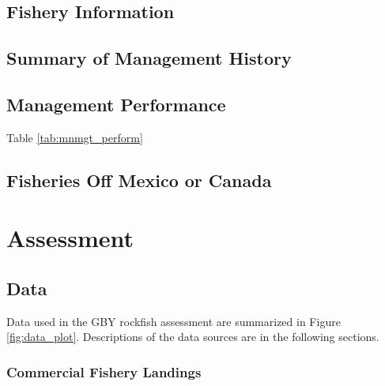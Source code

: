 \documentclass[12pt,]{article}
\begin{document}
\subsection{Fishery Information}\label{fishery-information}

\subsection{Summary of Management
History}\label{summary-of-management-history}

\subsection{Management Performance}\label{management-performance-1}

Table \ref{tab:mnmgt_perform}

\subsection{Fisheries Off Mexico or
Canada}\label{fisheries-off-mexico-or-canada}

\section{Assessment}\label{assessment}

\subsection{Data}\label{data}

Data used in the GBY rockfish assessment are summarized in Figure
\ref{fig:data_plot}. Descriptions of the data sources are in the
following sections.

\subsubsection{Commercial Fishery
Landings}\label{commercial-fishery-landings}
\end{document}
